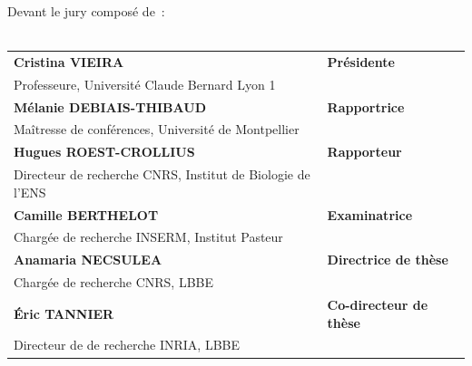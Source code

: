 \large{Devant le jury composé de~:\\\\}
\small {
\renewcommand{\arraystretch}{1.2}
\begin{tabular}{ll}
    \textbf{Cristina VIEIRA} &  \textbf{Présidente}         \\
    Professeure, Université Claude Bernard Lyon 1 \\
    
    \textbf{Mélanie DEBIAIS-THIBAUD} & \textbf{Rapportrice}         \\
    Maîtresse de conférences, Université de Montpellier \\
    
    \textbf{Hugues ROEST-CROLLIUS} & \textbf{Rapporteur}         \\
    Directeur de recherche CNRS, Institut de Biologie de l'ENS             \\
    
    \textbf{Camille BERTHELOT}  & \textbf{Examinatrice}        \\
    Chargée de recherche INSERM, Institut Pasteur \\
    
    \textbf{Anamaria NECSULEA}       & \textbf{Directrice de thèse} \\
    Chargée de recherche CNRS, LBBE \\
    
    \textbf{Éric TANNIER}       & \textbf{Co-directeur de thèse} \\
    Directeur de de recherche INRIA, LBBE \\
\end{tabular}
}
